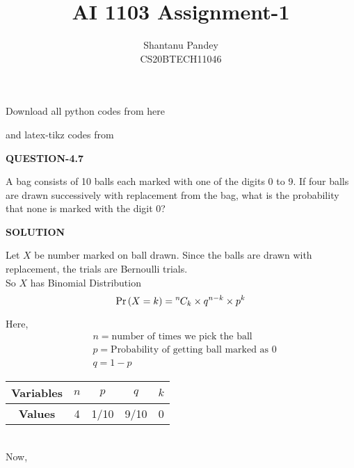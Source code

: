 \documentclass[a4paper]{article}
\title{AI 1103 Assignment-1}
\author{Shantanu Pandey\\ CS20BTECH11046}
\date{}
\providecommand{\pr}[1]{\ensuremath{\Pr\left(#1\right)}}
\newcommand*{\permcomb}[4][0mu]{{{}^{#3}\mkern#1#2_{#4}}}
\newcommand*{\comb}[1][-1mu]{\permcomb[#1]{C}}
\begin{document}
\maketitle
\noindent
Download all python codes from here

\begin{multicols*}{2}
\noindent
{}
    
\vspace{0.3cm}
and latex-tikz codes from  

\vspace{0.3cm}  
    
   
\vspace{0.5cm}
\textbf{QUESTION-4.7}
\vspace{0.5cm} 

A bag consists of 10 balls each marked with
one of the digits 0 to 9. If four balls are drawn
successively with replacement from the bag,
what is the probability that none is marked
with the digit 0?

\vspace{0.5cm}
\textbf{SOLUTION}
\vspace{0.5cm} 

\vspace{0.3cm}

Let $X$ be number marked on ball drawn.
Since the balls are drawn with replacement, the trials are Bernoulli trials.
\\
So $X$ has Binomial Distribution 
\begin{equation}
    \pr {X=k}=\comb{n}{k} \times q^{n-k} \times p^{k} 
\end{equation} 

Here,\\
\begin{align*}
& n = \text {number of times we pick the ball}  \\
& p= \text{Probability of getting ball marked as 0} \\
& q=1-p
\end{align*}

\begin{tabular}{|c|c|c|c|c|}
\hline
\textbf{Variables} & $n$ & $p$    & $q$    & $k$          \\ \hline
\textbf{Values}    & 4 & 1/10 & 9/10 & 0 \\ \hline
\end{tabular}
\\
Now,


\end{multicols*}
\end{document}
